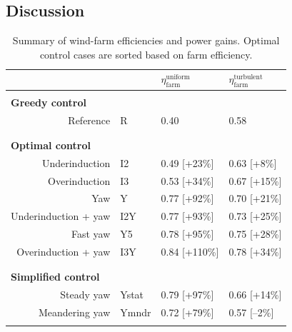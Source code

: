 \subsection{Discussion}\label{sec:opt_yaw_disc}
\begin{table}
	\caption{Summary of wind-farm efficiencies and power gains. Optimal control cases are sorted based on farm efficiency. \label{tab:yaw_summary}}
	\centering
	\begin{tabular}{rlll}
		\hline
		&   	 & $\eta_{\text{farm}}^{\text{uniform}}$  & $\eta_{\text{farm}}^{\text{turbulent}}$ \mystrut \mystrut\\
		\hline
		\\
		\multicolumn{1}{l}{\textbf{Greedy control}} & & & \\
		\mystrut		
		Reference   		    	& R 	 & 0.40					       & 0.58\\
		\\
		\hdashline
		\\
		\multicolumn{1}{l}{\textbf{Optimal control}} & & & \\
		\mystrut
		Underinduction  			& I2 	 & 0.49	[+23\%]				   & 0.63 [+8\%]\\
		\mystrut	
		
		Overinduction 	  			& I3 	 & 0.53	[+34\%]				   & 0.67 [+15\%]\\
		\mystrut
		
		Yaw 			    		& Y 	 & 0.77	[+92\%]				   & 0.70 [+21\%]\\
		\mystrut
		
		Underinduction + yaw 		& I2Y 	 & 0.77  [+93\%] 			   & 0.73 [+25\%]\\
		\mystrut
		
		Fast yaw  					& Y5	 & 0.78 [+95\%]  			   & 0.75 [+28\%]\\
		\mystrut
		
		Overinduction + yaw  		& I3Y 	 & 0.84	[+110\%]			   & 0.78 [+34\%]\\
		
		\\
		\hdashline
		\\		
		\multicolumn{1}{l}{\textbf{Simplified control}} & & & \\	
		\mystrut	
		Steady yaw  				& Ystat  & 0.79 	[+97\%]				   & 0.66 [+14\%]\\		        
		\mystrut
		
		Meandering yaw 				& Ymndr  & 0.72 [+79\%] 			   & 0.57 [--2\%]\\					
		\\				
		\hline
	\end{tabular}
\end{table}


